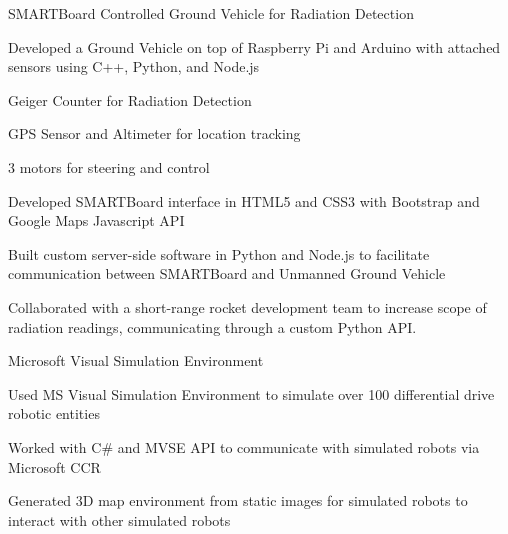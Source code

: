 \documentclass[]{alpha-cv}
\begin{document}
                {}
                {SMARTBoard Controlled Ground Vehicle for Radiation Detection}
                {\begin{itemize}{
                    \item{Developed a Ground Vehicle on top of Raspberry Pi and Arduino with attached sensors using C++, Python, and Node.js
                        \begin{itemize}{
                            \item{Geiger Counter for Radiation Detection}
                            \item{GPS Sensor and Altimeter for location tracking}
                            \item{3 motors for steering and control}
                        }\end{itemize}
                    }
                    \item{Developed SMARTBoard interface in HTML5 and CSS3 with Bootstrap and Google Maps Javascript API}
                    \item{Built custom server-side software in Python and Node.js to facilitate communication between SMARTBoard and Unmanned Ground Vehicle}}
                    \item{Collaborated with a short-range rocket development team to increase scope of radiation readings, communicating through a custom Python API.}
                \end{itemize}}

                {}
                {Microsoft Visual Simulation Environment}
                {\begin{itemize}{
                    \item{Used MS Visual Simulation Environment to simulate over 100 differential drive robotic entities}
                    \item{Worked with C\# and MVSE API to communicate with simulated robots via Microsoft CCR}
                    \item{Generated 3D map environment from static images for simulated robots to interact with other simulated robots}}
                \end{itemize}}               
                
\end{document}
